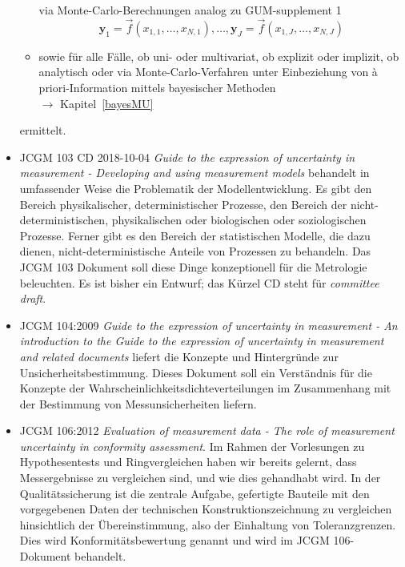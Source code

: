 \begin{itemize}
\begin{itemize}
    via Monte-Carlo-Berechnungen analog zu GUM-supplement 1
  \begin{equation}
  \mathbf{y}_1 = \vec f(x_{1,1},\dots,x_{N,1}), \dots, \mathbf{y}_J = \vec f(x_{1,J},\dots,x_{N,J})
  \end{equation}
  \item sowie für alle Fälle, ob uni- oder multivariat, ob explizit oder implizit, ob analytisch
    oder via Monte-Carlo-Verfahren unter Einbeziehung von {\`a} priori-Information mittels
    bayesischer Methoden\\
    $\rightarrow$ Kapitel~\ref{bayesMU}
  \end{itemize}
ermittelt.
\item JCGM 103 CD 2018-10-04 \textsl{Guide to the expression of uncertainty in measurement
- Developing and using measurement models} behandelt in umfassender Weise die Problematik der
Modellentwicklung. Es gibt den Bereich physikalischer, deterministischer Prozesse,
den Bereich der nicht-deterministischen, physikalischen oder biologischen oder soziologischen
Prozesse. Ferner gibt es den Bereich der statistischen Modelle, die dazu dienen, nicht-deterministische
Anteile von Prozessen zu behandeln. Das JCGM 103 Dokument soll diese Dinge konzeptionell
für die Metrologie beleuchten. Es ist bisher ein Entwurf; das Kürzel CD steht für \textsl{committee draft}.
\item JCGM 104:2009 \textsl{Guide to the expression of uncertainty in measurement
- An introduction to the Guide to the expression of
uncertainty in measurement and related documents} liefert die Konzepte und Hintergründe zur
Unsicherheitsbestimmung. Dieses Dokument soll ein Verständnis für die Konzepte der
Wahrscheinlichkeitsdichteverteilungen im Zusammenhang mit der Bestimmung von Messunsicherheiten liefern.
\item JCGM 106:2012 \textsl{Evaluation of measurement data - The role of
measurement uncertainty in conformity assessment}. Im Rahmen der Vorlesungen zu Hypothesentests und
Ringvergleichen haben wir bereits gelernt, dass Messergebnisse zu vergleichen sind, und wie dies
gehandhabt wird. In der Qualitätssicherung ist die zentrale Aufgabe, gefertigte Bauteile mit den
vorgegebenen Daten der technischen Konstruktionszeichnung zu vergleichen hinsichtlich der Übereinstimmung,
also der Einhaltung von Toleranzgrenzen. Dies wird Konformitätsbewertung genannt und wird im
JCGM 106-Dokument behandelt.
\end{itemize}

